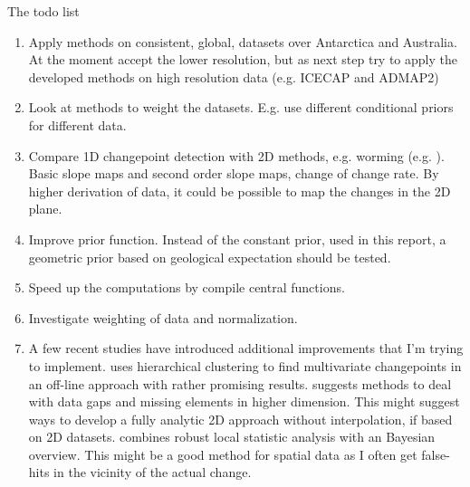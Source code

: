 
The todo list

\begin{enumerate}
	\item Apply methods on consistent, global, datasets over Antarctica and Australia. At the moment accept the lower resolution, but as next step try to apply the developed methods on high resolution data (e.g. ICECAP and ADMAP2)
	
	\item Look at methods to weight the datasets. E.g. use different conditional priors for different data. 
	
	\item Compare 1D changepoint detection with 2D methods, e.g. worming (e.g. \cite{Australia2013, fitzgerald2006innovative}). Basic slope maps and second order slope maps, change of change rate. By higher derivation of data, it could be possible to map the changes in the 2D plane. 
	
	\item Improve prior function. Instead of the constant prior, used in this report, a geometric prior based on geological expectation should be tested. 
	
	\item Speed up the computations by compile central functions. 
	
	\item Investigate weighting of data and normalization. 
	
	\item A few recent studies have introduced additional improvements that I'm trying to implement. \cite{Matteson1306} uses hierarchical clustering to find multivariate changepoints in an off-line approach with rather promising results.  \cite{Xie2013} suggests methods to deal with data gaps and missing elements in higher dimension. This might suggest ways to develop a fully analytic 2D approach without interpolation, if based on 2D datasets. \cite{Harle2014} combines robust local statistic analysis with an Bayesian overview. This might be a good method for spatial data as I often get false-hits in the vicinity of the actual change. 
\end{enumerate}

